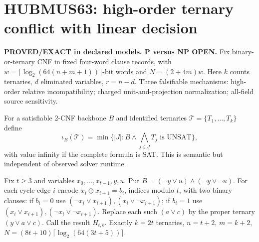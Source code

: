 \documentclass{article}
\begin{document}
\section*{HUBMUS63: high-order ternary conflict with linear decision}
\textbf{PROVED/EXACT in declared models. P versus NP OPEN.}
Fix binary-or-ternary CNF in fixed four-word clause records, with
$w=\lceil\log_2(64(n+m+1))\rceil$-bit words and $N=(2+4m)w$.
Here $k$ counts ternaries, $d$ eliminated variables, $r=n-d$.
Three falsifiable mechanisms: high-order relative incompatibility;
charged unit-and-projection normalization; all-field source sensitivity.

For a satisfiable 2-CNF backbone $B$ and identified ternaries
$\mathcal T=\{T_1,\ldots,T_k\}$ define
\[
\iota_B(\mathcal T)=\min\{|J|: B\land\bigwedge_{j\in J}T_j
\text{ is UNSAT}\},
\]
with value infinity if the complete formula is SAT. This is semantic
but independent of observed solver runtime.

Fix $t\ge3$ and variables $x_0,\ldots,x_{t-1},y,u$. Put
$B=(\neg y\vee u)\land(\neg y\vee\neg u)$.
For each cycle edge $i$ encode $x_i\oplus x_{i+1}=b_i$,
indices modulo $t$, with two binary clauses: if $b_i=0$ use
$(\neg x_i\vee x_{i+1}),(x_i\vee\neg x_{i+1})$;
if $b_i=1$ use $(x_i\vee x_{i+1}),(\neg x_i\vee\neg x_{i+1})$.
Replace each such $(a\vee c)$ by the proper ternary $(y\vee a\vee c)$.
Call the result $H_{t,b}$. Exactly $k=2t$ ternaries,
$n=t+2$, $m=k+2$, $N=(8t+10)\lceil\log_2(64(3t+5))\rceil$.
\end{document}

